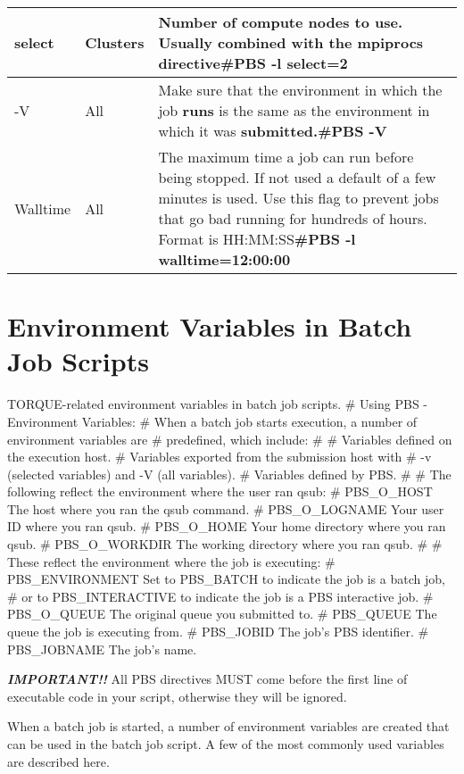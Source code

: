 \begin{tabular}{|p{0.5in}|p{0.5in}|p{3.5in}|}
select & Clusters & Number of compute nodes to use. Usually combined with the mpiprocs directive\newline \textbf{\#PBS -l select=2} \\ \hline
-V & All & Make sure that the environment in which the job \textbf{runs} is the same as the environment in which it was \textbf{submitted.\newline \#PBS -V} \\ \hline
Walltime & All & The maximum time a job can run before being stopped. If not used a default of a few minutes is used. Use this flag to prevent jobs that go bad running for hundreds of hours. Format is HH:MM:SS\newline \textbf{\#PBS -l walltime=12:00:00} \\ \hline
\end{tabular}

\section{Environment Variables in Batch Job Scripts}

TORQUE-related environment variables in batch job scripts.
\# Using PBS - Environment Variables:
   \# When a batch job starts execution, a number of environment variables are
   \# predefined, which include:
   \#
   \#      Variables defined on the execution host.
   \#      Variables exported from the submission host with
   \#                -v (selected variables) and -V (all variables).
   \#      Variables defined by PBS.
   \#
   \# The following reflect the environment where the user ran qsub:
   \# PBS\_O\_HOST    The host where you ran the qsub command.
   \# PBS\_O\_LOGNAME Your user ID where you ran qsub.
   \# PBS\_O\_HOME    Your home directory where you ran qsub.
   \# PBS\_O\_WORKDIR The working directory where you ran qsub.
   \#
   \# These reflect the environment where the job is executing:
   \# PBS\_ENVIRONMENT       Set to PBS\_BATCH to indicate the job is a batch job,
   \#         or to PBS\_INTERACTIVE to indicate the job is a PBS interactive job.
   \# PBS\_O\_QUEUE   The original queue you submitted to.
   \# PBS\_QUEUE     The queue the job is executing from.
   \# PBS\_JOBID     The job's PBS identifier.
   \# PBS\_JOBNAME   The job's name.

\textbf{\textit{IMPORTANT!!}} All PBS directives MUST come before the first line of executable code in your script, otherwise they will be ignored.

When a batch job is started, a number of environment variables are created that can be used in the batch job script. A few of the most commonly used variables are described here.

